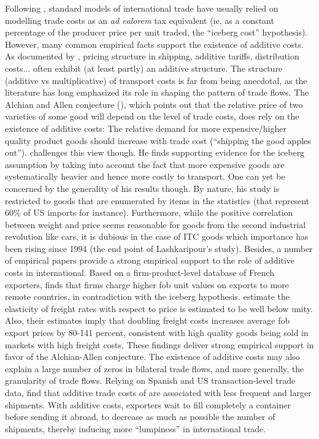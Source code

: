 \documentclass[a4paper,11pt]{article}
\begin{document}
Following \citet{samuelson1954}, standard models of international trade have usually relied on modelling trade costs as an \emph{ad valorem} tax equivalent (ie, as a constant percentage of the producer price per unit traded, the ``iceberg cost'' hypothesis). However, many common empirical facts support the existence of additive costs. As documented by \citet{Irrazabal_2015}, pricing structure in shipping, additive tariffs, distribution costs... often exhibit (at least partly) an additive structure. The structure (additive vs multiplicative) of transport costs is far from being anecdotal, as the literature has long emphasized its role in shaping the pattern of trade flows. The Alchian and Allen conjecture (\citealp{alchian}), which points out that the relative price of two varieties of some good will depend on the level of trade costs, does rely on the existence of additive costs: The relative demand for more expensive/higher quality product goods should increase with trade cost (``shipping the good apples out''). \citet{Lashkaripour-mimeo-2016} challenges this view though. He finds supporting evidence for the iceberg assumption by taking into account the fact that more expensive goods are systematically heavier and hence more costly to transport. One can yet be concerned by the generality of his results though. By nature, his study is restricted to goods that are enumerated by items in the statistics (that represent 60\% of US imports for instance). Furthermore, while the positive correlation between weight and price seems reasonable for goods from the second industrial revolution like cars, it is dubious in the case of ITC goods which importance has been rising since 1994 (the end point of Lashkaripour's study). Besides, a number of empirical papers provide a strong empirical support to the role of additive costs in international. Based on a firm-product-level database of French exporters, \citet{martin2012} finds that firms charge higher fob unit values on exports to more remote countries, in contradiction with the iceberg hypothesis. \citet{hummels_skiba} estimate the elasticity of freight rates with respect to price is estimated to be well below unity. Also, their estimates imply that doubling freight costs increases average fob export prices by 80-141 percent, consistent with high quality goods being sold in markets with high freight costs. These findings deliver strong empirical support in favor of the Alchian-Allen conjecture. The existence of additive costs may also explain a large number of zeros in bilateral trade flows, and more generally, the granularity of trade flows. Relying on Spanish and US transaction-level trade data, \citet{Hornok14} find that additive trade costs of are associated with less frequent and larger shipments. With additive costs, exporters wait to fill completely a container before sending it abroad, to decrease as much as possible the number of shipments, thereby inducing more ``lumpiness'' in international trade. \smallskip
\end{document}
